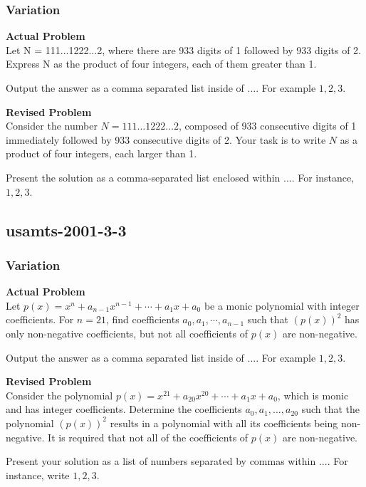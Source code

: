 \subsubsection{Variation}
\textbf{Actual Problem}\\
Let N = 111...1222...2, where there are 933 digits of 1 followed by 933 digits of 2.
Express N as the product of four integers, each of them greater than 1.

Output the answer as a comma separated list inside of $\boxed{...}$. For example $\boxed{1, 2, 3}$.

\textbf{Revised Problem}\\
Consider the number \( N = 111\ldots1222\ldots2 \), composed of 933 consecutive digits of 1 immediately followed by 933 consecutive digits of 2. Your task is to write \( N \) as a product of four integers, each larger than 1.

Present the solution as a comma-separated list enclosed within $\boxed{...}$. For instance, $\boxed{1, 2, 3}$.

\subsection{usamts-2001-3-3}
\subsubsection{Variation}
\textbf{Actual Problem}\\
Let $p(x) = x^n + a_{n-1}x^{n-1} + \cdots + a_1x + a_0$ be a monic polynomial with integer coefficients.
For $n = 21$, find coefficients $a_0, a_1, \cdots, a_{n-1}$ such that $(p(x))^2$ has only non-negative coefficients, but not all coefficients of $p(x)$ are non-negative.

Output the answer as a comma separated list inside of $\boxed{...}$. For example $\boxed{1, 2, 3}$.

\textbf{Revised Problem}\\
Consider the polynomial $p(x) = x^{21} + a_{20}x^{20} + \cdots + a_1x + a_0$, which is monic and has integer coefficients. Determine the coefficients $a_0, a_1, \ldots, a_{20}$ such that the polynomial $(p(x))^2$ results in a polynomial with all its coefficients being non-negative. It is required that not all of the coefficients of $p(x)$ are non-negative.

Present your solution as a list of numbers separated by commas within $\boxed{...}$. For instance, write $\boxed{1, 2, 3}$.

